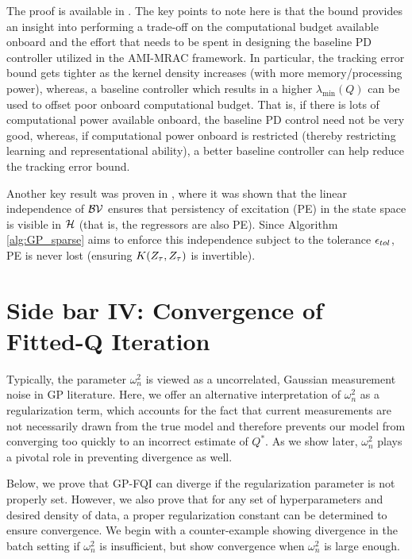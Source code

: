 \documentclass[letterpaper,12pt,peerreviewca,draftcls]{IEEEtran}
\begin{document}
The proof is available in \cite{Chowdhary13_TNN}. The key points to note here is that the bound provides an insight into performing a trade-off on the computational budget available onboard and the effort that needs to be spent in designing the baseline PD controller utilized in the AMI-MRAC framework. In particular, the tracking error bound gets tighter as the kernel density increases (with more memory/processing power), whereas, a baseline controller which results in a higher $λ_{\min}(Q)$ can be used to offset poor onboard computational budget. That is, if there is lots of computational power available onboard, the baseline PD control need not be very good, whereas, if computational power onboard is restricted (thereby restricting learning and representational ability), a better baseline controller can help reduce the tracking error bound.

Another key result was proven in \cite{Kingravi:TNN:2012}, where it was shown that the linear independence of $\mathcal{BV}$ ensures that persistency of excitation (PE) 
in the state space is visible in $\mathcal{H}$ (that is, the regressors are also PE). Since Algorithm \ref{alg:GP_sparse} aims to enforce this independence subject 
to the tolerance $\epsilon_{tol}$, PE is never lost (ensuring $K(Z_\tau,Z_\tau)$ is invertible).

\section{Side bar IV: Convergence of Fitted-Q Iteration}
Typically, the parameter $\omega_n^2$ is viewed as a uncorrelated, Gaussian measurement noise in GP literature. Here, we offer an alternative interpretation of $\omega_n^2$ as a regularization term, which accounts for the fact that current measurements are not necessarily drawn from the true model and therefore prevents our model from converging too quickly to an incorrect estimate of $Q^*$. As we show later, $\omega_n^2$ plays a pivotal role in preventing divergence as well. 

Below, we prove that GP-FQI can diverge if the regularization parameter is not properly set. However, we also prove that for any set of hyperparameters and desired density of data, a proper regularization constant can be determined to ensure convergence.  We begin with a counter-example showing divergence in the batch setting if $\omega_n^2$ is insufficient, but show convergence when $\omega_n^2$ is large enough. 
\end{document}
